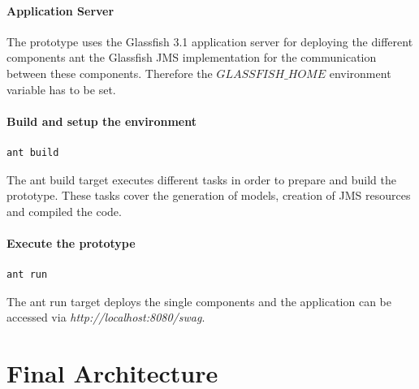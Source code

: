 \documentclass[a4paper]{article}
\begin{document}
\paragraph{Application Server}
The prototype uses the Glassfish 3.1 application server for deploying the different components ant the Glassfish JMS implementation for the communication between these components. Therefore the $GLASSFISH\_HOME$ environment variable has to be set.

\paragraph{Build and setup the environment}
\begin{verbatim}
ant build
\end{verbatim}

The ant build target executes different tasks in order to prepare and build the prototype. These tasks cover the generation of models, creation of JMS resources and compiled the code. 



\paragraph{Execute the prototype}
\begin{verbatim}
ant run
\end{verbatim}

The ant run target deploys the single components and the application can be accessed via \emph{http://localhost:8080/swag}.



\section{Final Architecture}
\end{document}
